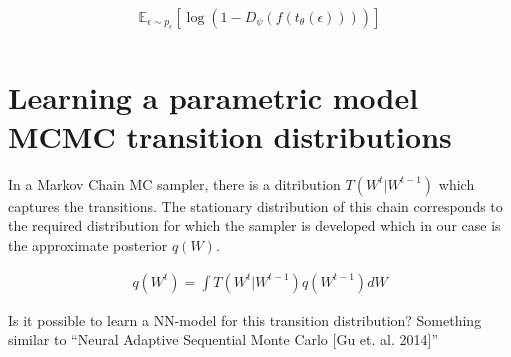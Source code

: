 \documentclass[twoside]{article}
\begin{document}
\begin{align}
\mathbb{E}_{\epsilon\sim p_{\epsilon}}[\log \left( 1-D_\psi(f(t_\theta(\epsilon))) \right) ]\\
\end{align}

\section{Learning a parametric model MCMC transition distributions}


In a Markov Chain MC sampler, there is a ditribution $T(W^{t}|W^{t-1})$ which captures the transitions. The stationary distribution of this chain corresponds to the required distribution for which the sampler is developed which in our case is the approximate posterior $q(W)$. 

\begin{align}
q(W^t) = \int T(W^{t}|W^{t-1})q(W^{t-1}) dW
\end{align}

Is it possible to learn a NN-model for this transition distribution? Something similar to ``Neural Adaptive Sequential Monte Carlo [Gu et. al. 2014]''


%
%
\end{document}
